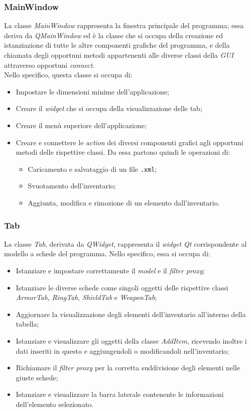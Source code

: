 \subsubsection{MainWindow}
La classe \textit{MainWindow} rappresenta la finestra principale del programma; essa deriva da \textit{QMainWindow} ed è la classe che si occupa della creazione ed istanziazione di tutte le altre componenti grafiche del programma, e della chiamata degli opportuni metodi appartenenti alle diverse classi della \textit{GUI} attraverso opportuni \textit{connect}. \\
Nello specifico, questa classe si occupa di:
\begin{itemize}
  \item Impostare le dimensioni minime dell'applicazione;
  \item Creare il \textit{widget} che si occupa della visualizzazione delle tab;
  \item Creare il menù superiore dell'applicazione;
  \item Creare e connettere le \textit{action} dei diversi componenti grafici agli opportuni metodi delle rispettive classi. Da essa partono quindi le operazioni di:
  \begin{itemize}
    \item Caricamento e salvataggio di un file \texttt{.xml};
    \item Svuotamento dell'inventario;
    \item Aggiunta, modifica e rimozione di un elemento dall'inventario.
  \end{itemize}
\end{itemize}

\subsubsection{Tab}
La classe \textit{Tab}, derivata da \textit{QWidget}, rappresenta il \textit{widget Qt} corrispondente al modello a schede del programma. Nello specifico, essa si occupa di:
\begin{itemize}
  \item Istanziare e impostare correttamente il \textit{model} e il \textit{filter proxy};
  \item Istanziare le diverse schede come singoli oggetti delle rispettive classi \textit{ArmorTab, RingTab, ShieldTab} e \textit{WeaponTab};
  \item Aggiornare la visualizzazione degli elementi dell'inventario all'interno della tabella;
  \item Istanziare e visualizzare gli oggetti della classe \textit{AddItem}, ricevendo inoltre i dati inseriti in questo e aggiungendoli o modificandoli nell'inventario;
  \item Richiamare il \textit{filter proxy} per la corretta suddivisione degli elementi nelle giuste schede;
  \item Istanziare e visualizzare la barra laterale contenente le informazioni dell'elemento selezionato.
\end{itemize}

